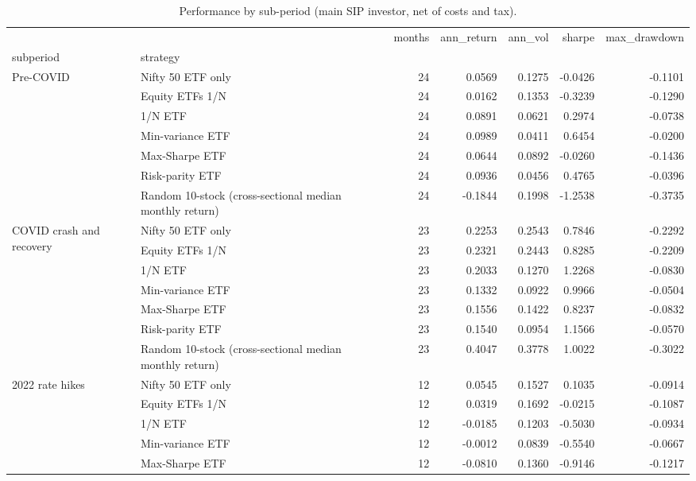 \begin{table}
\caption{Performance by sub-period (main SIP investor, net of costs and tax).}
\label{tab:T13_subperiods}
\begin{tabular}{llrrrrr}
\toprule
 &  & months & ann\_return & ann\_vol & sharpe & max\_drawdown \\
subperiod & strategy &  &  &  &  &  \\
\midrule
\multirow[t]{7}{*}{Pre-COVID} & Nifty 50 ETF only & 24 & 0.0569 & 0.1275 & -0.0426 & -0.1101 \\
 & Equity ETFs 1/N & 24 & 0.0162 & 0.1353 & -0.3239 & -0.1290 \\
 & 1/N ETF & 24 & 0.0891 & 0.0621 & 0.2974 & -0.0738 \\
 & Min-variance ETF & 24 & 0.0989 & 0.0411 & 0.6454 & -0.0200 \\
 & Max-Sharpe ETF & 24 & 0.0644 & 0.0892 & -0.0260 & -0.1436 \\
 & Risk-parity ETF & 24 & 0.0936 & 0.0456 & 0.4765 & -0.0396 \\
 & Random 10-stock (cross-sectional median monthly return) & 24 & -0.1844 & 0.1998 & -1.2538 & -0.3735 \\
\cline{1-7}
\multirow[t]{7}{*}{COVID crash and recovery} & Nifty 50 ETF only & 23 & 0.2253 & 0.2543 & 0.7846 & -0.2292 \\
 & Equity ETFs 1/N & 23 & 0.2321 & 0.2443 & 0.8285 & -0.2209 \\
 & 1/N ETF & 23 & 0.2033 & 0.1270 & 1.2268 & -0.0830 \\
 & Min-variance ETF & 23 & 0.1332 & 0.0922 & 0.9966 & -0.0504 \\
 & Max-Sharpe ETF & 23 & 0.1556 & 0.1422 & 0.8237 & -0.0832 \\
 & Risk-parity ETF & 23 & 0.1540 & 0.0954 & 1.1566 & -0.0570 \\
 & Random 10-stock (cross-sectional median monthly return) & 23 & 0.4047 & 0.3778 & 1.0022 & -0.3022 \\
\cline{1-7}
\multirow[t]{7}{*}{2022 rate hikes} & Nifty 50 ETF only & 12 & 0.0545 & 0.1527 & 0.1035 & -0.0914 \\
 & Equity ETFs 1/N & 12 & 0.0319 & 0.1692 & -0.0215 & -0.1087 \\
 & 1/N ETF & 12 & -0.0185 & 0.1203 & -0.5030 & -0.0934 \\
 & Min-variance ETF & 12 & -0.0012 & 0.0839 & -0.5540 & -0.0667 \\
 & Max-Sharpe ETF & 12 & -0.0810 & 0.1360 & -0.9146 & -0.1217 \\

\end{tabular}
\end{table}
